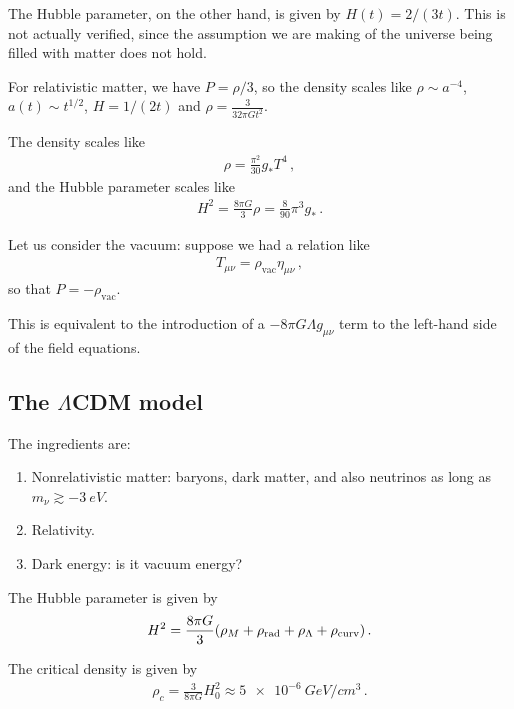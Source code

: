 \documentclass[main.tex]{subfiles}
\begin{document}
The Hubble parameter, on the other hand, is given by \(H(t) = 2 / (3 t)\). This is not actually verified, since the assumption we are making of the universe being filled with matter does not hold. 

For relativistic matter, we have \(P = \rho /3\), so the density scales like \(\rho \sim a^{-4}\), \(a(t) \sim t^{1/2}\), \(H = 1/(2t)\) and \(\rho = \frac{3}{32 \pi G t^2} \).

The density scales like 
%
\begin{align}
\rho = \frac{\pi^2}{30} g_{*} T^{4}
\,,
\end{align}
%
and the Hubble parameter scales like 
%
\begin{align}
H^2 = \frac{8\pi G}{3} \rho = \frac{8}{90} \pi^3 g_{*}
\,.
\end{align}

Let us consider the vacuum: suppose we had a relation like 
%
\begin{align}
T_{\mu \nu } = \rho _{\text{vac}} \eta_{\mu \nu }
\,,
\end{align}
%
so that \(P = - \rho _{\text{vac}}\).

This is equivalent to the introduction of a \(- 8 \pi G \Lambda g_{\mu \nu }\) term to the left-hand side of the field equations. 

\subsection{The \(\Lambda \)CDM model}

The ingredients are: 
\begin{enumerate}
    \item Nonrelativistic matter: baryons, dark matter, and also neutrinos as long as \(m_{\nu } \gtrsim \SI{-3}{eV}\). 
    \item Relativity.
    \item Dark energy: is it vacuum energy? 
\end{enumerate}

The Hubble parameter is given by 
%
\begin{align}
H^2 = \frac{8 \pi G}{3} \qty(\rho_{M} + \rho _{\text{rad}} + \rho_{\Lambda } + \rho _{\text{curv}})
\,.
\end{align}

The critical density is given by 
%
\begin{align}
\rho_{c} = \frac{3}{8 \pi G} H_0^2 \approx \SI{5e-6}{GeV / cm^3}
\,.
\end{align}
\end{document}
